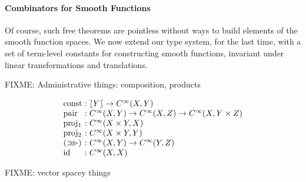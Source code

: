 \documentclass[preprint]{sigplanconf}
\newcommand{\comp}{\mathrel{>\kern-0.45em>\kern-0.45em>}}
\newcommand{\typeOfCartSp}[1]{\lbag #1 \rbag}
\theoremstyle{examplestyle}
\begin{document}
\paragraph{Combinators for Smooth Functions} Of course, such free
theorems are pointless without ways to build elements of the smooth
function spaces. We now extend our type system, for the last time,
with a set of term-level constants for constructing smooth functions,
invariant under linear transformations and translations.

FIXME: Administrative things: composition, products

\begin{displaymath}
  \begin{array}{l@{\hspace{0.3em}}c@{\hspace{0.3em}}l}
    \mathrm{const} &:& \typeOfCartSp{Y} \to C^\infty(X, Y) \\
    \mathrm{pair} &:& C^\infty(X,Y) \to C^\infty(X,Z) \to C^\infty(X, Y \times Z) \\
    \mathrm{proj_1}&:& C^\infty(X \times Y, X) \\
    \mathrm{proj_2}&:& C^\infty(X \times Y, Y) \\
    (\comp) &:& C^\infty(X,Y) \to C^\infty(Y,Z) \\
    \mathrm{id} &:& C^\infty(X,X)
  \end{array}
\end{displaymath}

FIXME: vector spacey things
\end{document}
